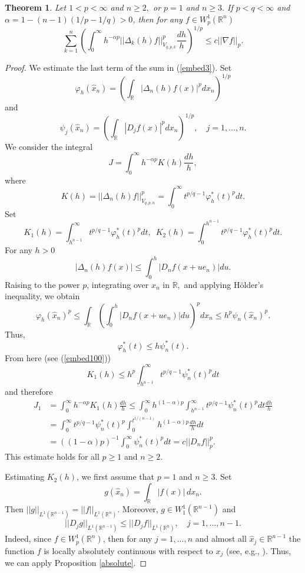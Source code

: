 \documentclass[12pt,twoside,reqno]{amsart}
\numberwithin{equation}{section}
\newtheorem{teo}{Theorem}[section]
\theoremstyle{definition}
\numberwithin{equation}{section}
\def\a{\alpha}
\def\R{\mathbb{R}}
\def\f{\varphi}
\def\D{\Delta}
\begin{document}
\begin{teo}\label{refined}
Let $1<p<\infty$ and $n\ge 2,$  or $p=1$ and $n\ge 3.$ If $p<q<\infty$ and $\a=1-(n-1)(1/p-1/q)>0$, then for any $f\in W_p^1(\R^n)$
\begin{equation}\label{embed3}
\sum_{k=1}^n \left(\int_0^\infty h^{-\a p}||\D_k(h)f||^p_{V_{q, p,k}}\frac{dh}{h}\right)^{1/p}\le c ||\nabla f||_p.
\end{equation}
\end{teo}
\begin{proof}
We estimate the last term of the sum in (\ref{embed3}). Set
$$
\f_h(\widehat x_n)=\left(\int_\R |\D_n(h)f(x)|^pdx_n\right)^{1/p}
$$
and
$$
\psi_j(\widehat x_n)=\left(\int_\R |D_j f(x)|^pdx_n\right)^{1/p},\quad j=1,...,n.
$$
We consider the integral
\begin{equation}\label{embed5}
J=\int_0^\infty h^{-\a p}K(h)\frac{dh}{h},
\end{equation}
where
$$
K(h)=||\D_n(h)f||_{V_{q,p,n}}^p=\int_0^\infty t^{p/q-1}\f_h^*(t)^pdt.
$$
Set
\begin{equation}\label{embed100}
K_1(h)=\int_{h^{n-1}}^\infty t^{p/q-1}\f_h^*(t)^pdt, \,\,\, K_2(h)=\int_0^{h^{n-1}} t^{p/q-1}\f_h^*(t)^pdt.
\end{equation}
For any $h>0$
$$
|\D_n(h)f(x)|\le \int_0^h |D_n f(x+u e_n)| du.
$$
Raising to the power $p$, integrating over $x_n$ in $\R,$ and applying H\"older's inequality, we obtain
$$
\f_h(\widehat x_n)^p\le \int_\R \left(\int_0^h |D_n f(x+u e_n)| du \right)^p d x_n\le h^p\psi_n(\widehat x_n)^p.
$$
Thus,
\begin{equation}\label{embed101}
\f_h^*(t)\le h\psi_n^*(t).
\end{equation}
From here (see (\ref{embed100}))
$$
K_1(h)\le h^p\int_{h^{n-1}}^\infty t^{p/q-1}\psi_n^*(t)^p dt
$$
and therefore
$$
\begin{aligned}
J_1&= \int_0^\infty h^{-\a p}K_1(h)\frac{dh}{h}\le \int_0^\infty h^{(1-\a)p}\int_{h^{n-1}}^\infty t^{p/q-1}\psi_n^*(t)^p dt\frac{dh}{h}\\
&=\int_0^\infty t^{p/q-1}\psi_n^*(t)^p \int_0^{t^{1/(n-1)}} h^{(1-\a) p}\frac{dh}{h}dt\\
&=((1-\a)p)^{-1}\int_0^\infty \psi_n^*(t)^p dt=c||D_nf||_p^p.
\end{aligned}
$$
This estimate holds for all $p\ge 1$ and $n\ge 2.$

Estimating $K_2(h)$, we first assume that $p=1$ and $n\ge 3.$
Set
$$
g(\widehat x_n)=\int_\R |f(x)|\,dx_n.
$$
Then $||g||_{L^1(\R^{n-1})}=||f||_{L^1(\R^n)}.$ Moreover, $g\in W_1^1(\R^{n-1})$ and
\begin{equation}\label{embed4}
||D_j g||_{L^1(\R^{n-1})}\le ||D_{j} f||_{L^1(\R^n)},\quad j=1,...,n-1.
\end{equation}
Indeed, since $f\in W_p^1(\R^n)$, then for any $j=1,...,n$ and almost all $\widehat x_j\in\R^{n-1}$ the function $f$ is locally absolutely continuous with respect to $x_j$ (see, e.g., \cite[2.1.4]{Zie}). Thus, we can apply Proposition \ref{absolute}.


\end{proof}
\end{document}
